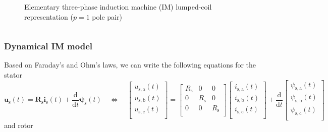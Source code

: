 \begin{frame}
\begin{columns}
\begin{column}{0.45\textwidth}
\begin{figure}
                \caption{Elementary three-phase induction machine (IM) lumped-coil representation ($p=1$ pole pair)}
                \label{fig:Simple_three_phase_induction_machine_lumped_coils}
            \end{figure}
        \end{column}
    \end{columns}
\end{frame}

\begin{frame}
	\frametitle{Dynamical IM model}
    Based on Faraday's and Ohm's laws, we can write the following equations for the stator 
    \begin{equation}
            \bm{u}_\mathrm{s}(t) = \bm{R}_\mathrm{s}\bm{i}_\mathrm{s}(t)+\frac{\mathrm{d}}{\mathrm{d}t}\bm{\psi}_\mathrm{s}(t) \quad \Leftrightarrow \quad \begin{bmatrix}
                u_{\mathrm{s,a}}(t)\\
                u_{\mathrm{s,b}}(t)\\
                u_{\mathrm{s,c}}(t)\\
            \end{bmatrix} = \begin{bmatrix}
                R_\mathrm{s} & 0 & 0\\
                0 & R_\mathrm{s} & 0\\
                0 & 0 & R_\mathrm{s}\\
            \end{bmatrix} \begin{bmatrix}
                i_{\mathrm{s,a}}(t)\\
                i_{\mathrm{s,b}}(t)\\
                i_{\mathrm{s,c}}(t)\\
            \end{bmatrix} + \frac{\mathrm{d}}{\mathrm{d}t} \begin{bmatrix}
                \psi_{\mathrm{s,a}}(t)\\
                \psi_{\mathrm{s,b}}(t)\\
                \psi_{\mathrm{s,c}}(t)\\
            \end{bmatrix}
    \end{equation}
    and rotor
    \begin{equation}

\end{equation}
\end{frame}
